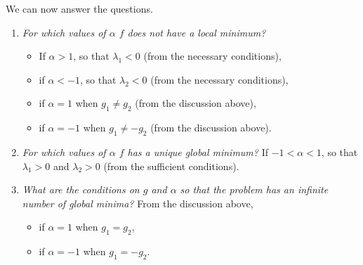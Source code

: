 We can now answer the questions. 

\begin{enumerate}
\item \emph{For which values of $\alpha$ $f$ does not have a local
minimum?}
  \begin{itemize}
    \item If $\alpha > 1$, so that $\lambda_1 <
      0$ (from the necessary conditions),
    \item if $\alpha  < -1$, so that $\lambda_2 < 0$ (from the
      necessary conditions),
    \item if $\alpha = 1$ when $g_1\neq g_2$ (from the discussion above), 
    \item if $\alpha = -1$ when $g_1\neq -g_2$ (from the discussion above).
  \end{itemize}

\item \emph{For which values of $\alpha$ $f$ has a unique global
  minimum?}  If $-1 < \alpha < 1$, so that $\lambda_1
  > 0$ and $\lambda_2 > 0$ (from the sufficient conditions).

\item \emph{What are the conditions on $g$ and $\alpha$ so that the
problem has an infinite number of global minima?}
  From the discussion above,
  \begin{itemize}
  \item if $\alpha=1$ when $g_1=g_2$, 
  \item if $\alpha=-1$ when $g_1=-g_2$.
  \end{itemize}
\end{enumerate}
